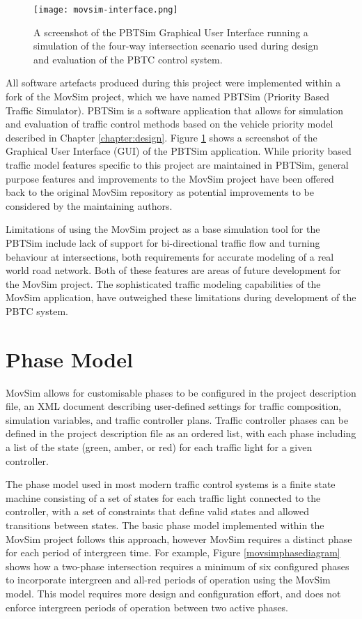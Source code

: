 \begin{figure}[]
\centering
	\texttt{[image: movsim-interface.png]}
	\caption[A screenshot of the PBTSim user interface showing an example intersection.]{ A screenshot of the PBTSim Graphical User Interface running a simulation of the four-way intersection scenario used during design and evaluation of the PBTC control system. }
\label{pbtsim-interface}
\end{figure}

All software artefacts produced during this project were implemented within a fork of the MovSim project, which we have named PBTSim (Priority Based Traffic Simulator). PBTSim is a software application that allows for simulation and evaluation of traffic control methods based on the vehicle priority model described in Chapter \ref{chapter:design}. Figure \ref{pbtsim-interface} shows a screenshot of the Graphical User Interface (GUI) of the PBTSim application. While priority based traffic model features specific to this project are maintained in PBTSim, general purpose features and improvements to the MovSim project have been offered back to the original MovSim repository as potential improvements to be considered by the maintaining authors. 

Limitations of using the MovSim project as a base simulation tool for the PBTSim include lack of support for bi-directional traffic flow and turning behaviour at intersections, both requirements for accurate modeling of a real world road network. Both of these features are areas of future development for the MovSim project. The sophisticated traffic modeling capabilities of the MovSim application, have outweighed these limitations during development of the PBTC system.

\section{Phase Model}

MovSim allows for customisable phases to be configured in the project description file, an XML document describing user-defined settings for traffic composition, simulation variables, and traffic controller plans. Traffic controller phases can be defined in the project description file as an ordered list, with each phase including a list of the state (green, amber, or red) for each traffic light for a given controller. 


The phase model used in most modern traffic control systems is a finite state machine consisting of a set of states for each traffic light connected to the controller, with a set of constraints that define valid states and allowed transitions between states. The basic phase model implemented within the MovSim project follows this approach, however MovSim requires a distinct phase for each period of intergreen time. For example, Figure \ref{movsimphasediagram} shows how a two-phase intersection requires a minimum of six configured phases to incorporate intergreen and all-red periods of operation using the MovSim model. This model requires more design and configuration effort, and does not enforce intergreen periods of operation between two active phases.


